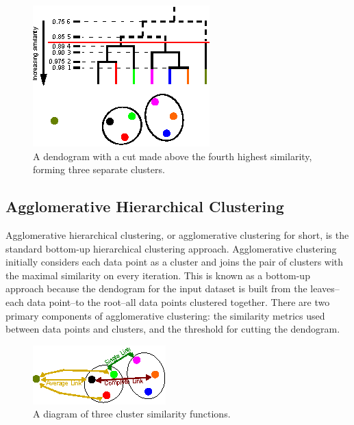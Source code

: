 \documentclass[12pt]{ucthesis}
\begin{document}
      \begin{figure}[t]
         \centering
         \includegraphics[width=0.7\columnwidth]{graphics/DendogramExample_WithCut.eps}
         \caption{A dendogram with a cut made above the fourth highest
                  similarity, forming three separate clusters.}
         \label{fig:dendogram_example_with_cut}
      \end{figure}

      \subsection{Agglomerative Hierarchical Clustering}\label{sec:agglomerative}
         \textsf{Agglomerative hierarchical clustering}, or
         \textsf{agglomerative clustering} for short, is the standard
         bottom-up hierarchical clustering approach. \textsf{Agglomerative
         clustering} initially considers each data point as a cluster and joins
         the pair of clusters with the maximal similarity on every iteration.
         This is known as a bottom-up approach because the dendogram for the
         input dataset is built from the leaves--each data point--to the
         root--all data points clustered together. There are two primary
         components of \textsf{agglomerative clustering}: the similarity
         metrics used between data points and clusters, and the threshold for
         cutting the dendogram.

         \begin{figure}[t]
            \centering
            \includegraphics[width=0.7\columnwidth]{graphics/ClusterMetrics.eps}
            \caption{A diagram of three cluster similarity functions.}
            \label{fig:cluster_metrics}
         \end{figure}
\end{document}

